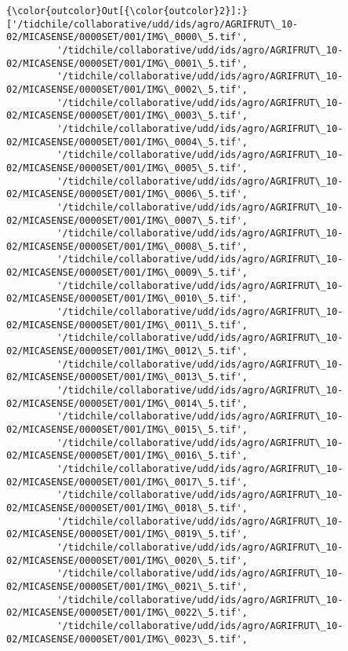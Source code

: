 \documentclass[11pt]{article}
\begin{document}
\begin{Verbatim}[commandchars=\\\{\}]
{\color{outcolor}Out[{\color{outcolor}2}]:} ['/tidchile/collaborative/udd/ids/agro/AGRIFRUT\_10-02/MICASENSE/0000SET/001/IMG\_0000\_5.tif',
         '/tidchile/collaborative/udd/ids/agro/AGRIFRUT\_10-02/MICASENSE/0000SET/001/IMG\_0001\_5.tif',
         '/tidchile/collaborative/udd/ids/agro/AGRIFRUT\_10-02/MICASENSE/0000SET/001/IMG\_0002\_5.tif',
         '/tidchile/collaborative/udd/ids/agro/AGRIFRUT\_10-02/MICASENSE/0000SET/001/IMG\_0003\_5.tif',
         '/tidchile/collaborative/udd/ids/agro/AGRIFRUT\_10-02/MICASENSE/0000SET/001/IMG\_0004\_5.tif',
         '/tidchile/collaborative/udd/ids/agro/AGRIFRUT\_10-02/MICASENSE/0000SET/001/IMG\_0005\_5.tif',
         '/tidchile/collaborative/udd/ids/agro/AGRIFRUT\_10-02/MICASENSE/0000SET/001/IMG\_0006\_5.tif',
         '/tidchile/collaborative/udd/ids/agro/AGRIFRUT\_10-02/MICASENSE/0000SET/001/IMG\_0007\_5.tif',
         '/tidchile/collaborative/udd/ids/agro/AGRIFRUT\_10-02/MICASENSE/0000SET/001/IMG\_0008\_5.tif',
         '/tidchile/collaborative/udd/ids/agro/AGRIFRUT\_10-02/MICASENSE/0000SET/001/IMG\_0009\_5.tif',
         '/tidchile/collaborative/udd/ids/agro/AGRIFRUT\_10-02/MICASENSE/0000SET/001/IMG\_0010\_5.tif',
         '/tidchile/collaborative/udd/ids/agro/AGRIFRUT\_10-02/MICASENSE/0000SET/001/IMG\_0011\_5.tif',
         '/tidchile/collaborative/udd/ids/agro/AGRIFRUT\_10-02/MICASENSE/0000SET/001/IMG\_0012\_5.tif',
         '/tidchile/collaborative/udd/ids/agro/AGRIFRUT\_10-02/MICASENSE/0000SET/001/IMG\_0013\_5.tif',
         '/tidchile/collaborative/udd/ids/agro/AGRIFRUT\_10-02/MICASENSE/0000SET/001/IMG\_0014\_5.tif',
         '/tidchile/collaborative/udd/ids/agro/AGRIFRUT\_10-02/MICASENSE/0000SET/001/IMG\_0015\_5.tif',
         '/tidchile/collaborative/udd/ids/agro/AGRIFRUT\_10-02/MICASENSE/0000SET/001/IMG\_0016\_5.tif',
         '/tidchile/collaborative/udd/ids/agro/AGRIFRUT\_10-02/MICASENSE/0000SET/001/IMG\_0017\_5.tif',
         '/tidchile/collaborative/udd/ids/agro/AGRIFRUT\_10-02/MICASENSE/0000SET/001/IMG\_0018\_5.tif',
         '/tidchile/collaborative/udd/ids/agro/AGRIFRUT\_10-02/MICASENSE/0000SET/001/IMG\_0019\_5.tif',
         '/tidchile/collaborative/udd/ids/agro/AGRIFRUT\_10-02/MICASENSE/0000SET/001/IMG\_0020\_5.tif',
         '/tidchile/collaborative/udd/ids/agro/AGRIFRUT\_10-02/MICASENSE/0000SET/001/IMG\_0021\_5.tif',
         '/tidchile/collaborative/udd/ids/agro/AGRIFRUT\_10-02/MICASENSE/0000SET/001/IMG\_0022\_5.tif',
         '/tidchile/collaborative/udd/ids/agro/AGRIFRUT\_10-02/MICASENSE/0000SET/001/IMG\_0023\_5.tif',

\end{Verbatim}
\end{document}
